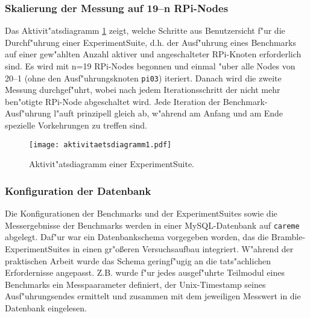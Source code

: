 \subsubsection{Skalierung der Messung auf 19--n RPi-Nodes} 

Das Aktivit"atsdiagramm \ref{fig:Aktivitaetsdiagramm} zeigt, welche Schritte aus Benutzersicht f"ur die Durchf"uhr\-ung einer ExperimentSuite, d.h. der Ausf"uhrung eines Benchmarks auf einer gew"ahlten Anzahl aktiver und angeschalteter RPi-Knoten erforderlich sind. Es wird mit n=19 RPi-Nodes begonnen und einmal "uber alle Nodes von 20--1 (ohne den Ausf"uhrungsknoten \texttt{pi03}) iteriert. Danach wird die zweite Messung durchgef"uhrt, wobei nach jedem Iterationsschritt der nicht mehr ben"otigte RPi-Node abgeschaltet wird. Jede Iteration der Benchmark-Ausf"uhrung l"auft prinzipell gleich ab, w"ahrend am Anfang und am Ende spezielle Vorkehrungen zu treffen sind. 
\begin{figure}[htb]
  \centerline{\texttt{[image: aktivitaetsdiagramm1.pdf]}} 
  \caption{Aktivit"atsdiagramm einer ExperimentSuite.}
  \label{fig:Aktivitaetsdiagramm}
\end{figure}

\subsubsection{Konfiguration der Datenbank}

Die Konfigurationen der Benchmarks und der ExperimentSuites sowie die Messergebnisse der Benchmarks werden in einer MySQL-Datenbank auf \texttt{careme} abgelegt. Daf"ur war ein Datenbankschema vorgegeben worden, das die Bramble-ExperimentSuites in einen gr"o\ss eren Versuchsaufbau integriert. W"ahrend der praktischen Arbeit wurde das Schema geringf"ugig an die tats"achlichen Erfordernisse angepasst. Z.B. wurde f"ur jedes ausgef"uhrte Teilmodul eines Benchmarks ein Messpaarameter definiert, der Unix-Timestamp seines Ausf"uhrungsendes ermittelt und zusammen mit dem jeweiligen Messwert in die Datenbank eingelesen.

